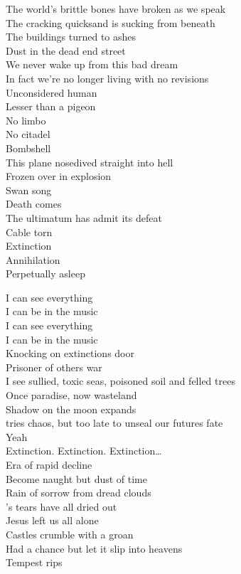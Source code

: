 The world's brittle bones have broken as we speak\\
The cracking quicksand is sucking from beneath\\
The buildings turned to ashes\\
Dust in the dead end street\\
We never wake up from this bad dream\\
In fact we're no longer living with no revisions\\
Unconsidered human\\
Lesser than a pigeon\\
No limbo\\
No citadel\\
Bombshell\\
This plane nosedived straight into hell\\
Frozen over in explosion\\

Swan song\\
Death comes\\
The ultimatum has admit its defeat\\
Cable torn\\
Extinction\\
Annihilation\\
Perpetually asleep\\



I can see everything\\
I can be in the music\\
I can see everything\\
I can be in the music\\

Knocking on extinctions door\\
Prisoner of others war\\
I see sullied, toxic seas, poisoned soil and felled trees\\
Once paradise, now wasteland\\
Shadow on the moon expands\\
 tries chaos, but too late to unseal our futures fate\\
Yeah\\

Extinction. Extinction. Extinction…\\

Era of rapid decline\\
Become naught but dust of time\\
Rain of sorrow from dread clouds\\
's tears have all dried out\\
Jesus left us all alone\\
Castles crumble with a groan\\
Had a chance but let it slip into heavens\\
Tempest rips\\

